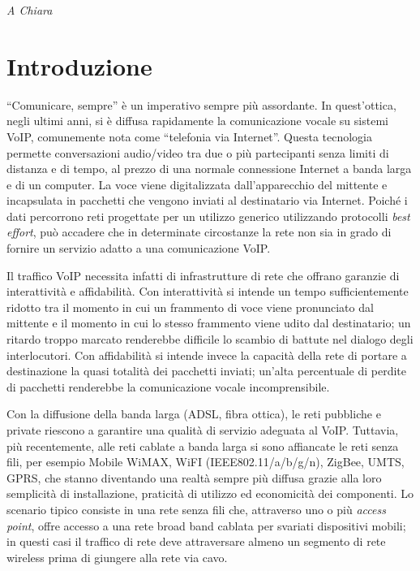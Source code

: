 \documentclass[12pt,a4paper,openright,twoside]{book}
\begin{document}
%
%
\begin{titlepage}
  \thispagestyle{empty}
  \topmargin=6.5cm
  \raggedleft
  \large
  \em A Chiara
  \newpage
  \clearpage{\pagestyle{empty}\cleardoublepage}
\end{titlepage}



\chapter*{Introduzione}

``Comunicare, sempre'' è un imperativo sempre più assordante. In
quest'ottica, negli ultimi anni, si è diffusa rapidamente la
comunicazione vocale su sistemi VoIP, comunemente nota come
``telefonia via Internet''. Questa tecnologia permette conversazioni
audio/video tra due o più partecipanti senza limiti di distanza e di
tempo, al prezzo di una normale connessione Internet a banda larga e
di un computer. La voce viene digitalizzata dall'apparecchio del
mittente e incapsulata in pacchetti che vengono inviati al
destinatario via Internet. Poiché i dati percorrono reti progettate
per un utilizzo generico utilizzando protocolli \emph{best effort},
può accadere che in determinate circostanze la rete non sia in grado
di fornire un servizio adatto a una comunicazione VoIP.

Il traffico VoIP necessita infatti di infrastrutture di rete che
offrano garanzie di interattività e affidabilità. Con interattività si
intende un tempo sufficientemente ridotto tra il momento in cui un
frammento di voce viene pronunciato dal mittente e il momento in cui
lo stesso frammento viene udito dal destinatario; un ritardo troppo
marcato renderebbe difficile lo scambio di battute nel dialogo degli
interlocutori. Con affidabilità si intende invece la capacità della
rete di portare a destinazione la quasi totalità dei pacchetti
inviati; un'alta percentuale di perdite di pacchetti renderebbe la
comunicazione vocale incomprensibile.

Con la diffusione della banda larga (ADSL, fibra ottica), le reti
pubbliche e private riescono a garantire una qualità di servizio
adeguata al VoIP. Tuttavia, più recentemente, alle reti cablate a
banda larga si sono affiancate le reti senza fili, per esempio Mobile
WiMAX, WiFI (IEEE802.11/a/b/g/n), ZigBee, UMTS, GPRS, che stanno
diventando una realtà sempre più diffusa grazie alla loro semplicità
di installazione, praticità di utilizzo ed economicità dei
componenti. Lo scenario tipico consiste in una rete senza fili che,
attraverso uno o più \emph{access point}, offre accesso a una rete
broad band cablata per svariati dispositivi mobili; in questi casi il
traffico di rete deve attraversare almeno un segmento di rete wireless
prima di giungere alla rete via cavo.
\end{document}
